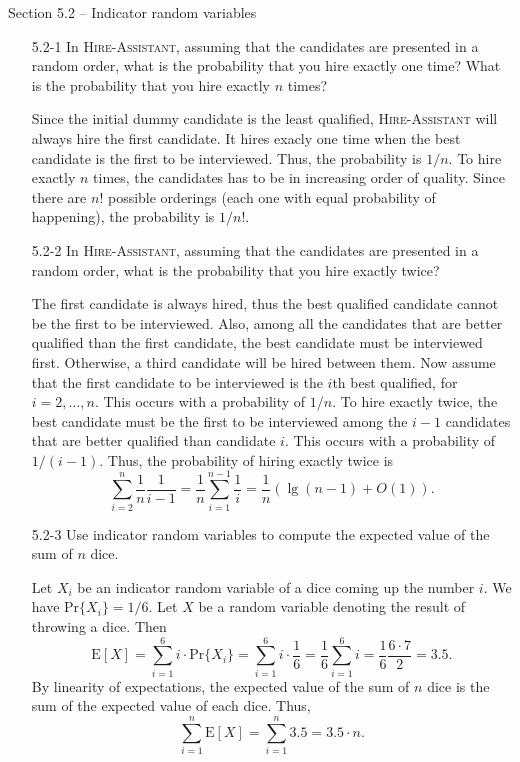 \documentclass{report}
\makeatletter
\renewenvironment{framed}{%
 \def\FrameCommand##1{\hskip\@totalleftmargin
 \fboxsep=\FrameSep\fbox{##1}}%
 \MakeFramed {\advance\hsize-\width
   \@totalleftmargin\z@ \linewidth\hsize
   \@setminipage}}%
 {\par\unskip\endMakeFramed}
\makeatother
\begin{document}
{\large Section 5.2 {--} Indicator random variables}

\begin{enumerate}

\item[5.2{-}1]{In \textsc{Hire-Assistant}, assuming that the candidates are
presented in a random order, what is the probability that you hire exactly
one time? What is the probability that you hire exactly $n$ times?}

\begin{framed}
Since the initial dummy candidate is the least qualified,
\textsc{Hire-Assistant} will always hire the first candidate. It hires exacly
one time when the best candidate is the first to be interviewed. Thus, the
probability is $1/n$. To hire exactly $n$ times, the candidates has to be in
increasing order of quality. Since there are $n!$ possible orderings (each one
with equal probability of happening), the probability is $1/n!$.
\end{framed}

\item[5.2{-}2]{In \textsc{Hire-Assistant}, assuming that the candidates are
presented in a random order, what is the probability that you hire exactly
twice?}

\begin{framed}
The first candidate is always hired, thus the best qualified candidate cannot be
the first to be interviewed. Also, among all the candidates that are better
qualified than the first candidate, the best candidate must be interviewed first.
Otherwise, a third candidate will be hired between them. Now assume that the
first candidate to be interviewed is the $i$th best qualified, for $i = 2,
\dots, n$. This occurs with a probability of $1/n$. To hire exactly twice, the
best candidate must be the first to be interviewed among the $i - 1$ candidates
that are better qualified than candidate $i$. This occurs with a probability
of $1/(i - 1)$. Thus, the probability of hiring exactly twice is
\[
  \sum_{i = 2}^{n} \frac{1}{n} \frac{1}{i - 1} = \frac{1}{n} \sum_{i = 1}^{n - 1} \frac{1}{i} = \frac{1}{n} (\lg(n - 1) + O(1)).
\]
\end{framed}

\item[5.2{-}3]{Use indicator random variables to compute the expected value of
the sum of $n$ dice.}

\begin{framed}
Let $X_i$ be an indicator random variable of a dice coming up the number $i$. We
have $\text{Pr}\{X_i\} = 1/6$. Let $X$ be a random variable denoting the
result of throwing a dice. Then
\[
  \text{E}[X] = \sum_{i = 1}^{6} i \cdot \text{Pr}\{X_i\}
              = \sum_{i = 1}^{6} i \cdot \frac{1}{6}
              = \frac{1}{6} \sum_{i = 1}^{6} i
              = \frac{1}{6} \frac{6 \cdot 7}{2} = 3.5.
\]
By linearity of expectations, the expected value of the sum of $n$ dice is the
sum of the expected value of each dice. Thus,
\[
  \sum_{i = 1}^{n} \text{E}[X] = \sum_{i = 1}^{n} 3.5 = 3.5 \cdot n.
\]
\end{framed}


\end{enumerate}
\end{document}
